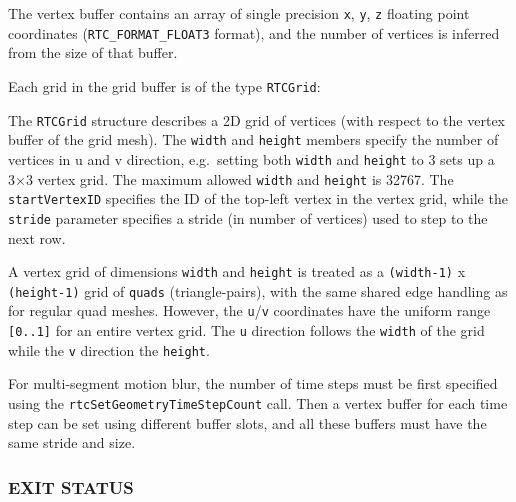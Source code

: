 The vertex buffer contains an array of single precision \texttt{x},
\texttt{y}, \texttt{z} floating point coordinates
(\texttt{RTC\_FORMAT\_FLOAT3} format), and the number of vertices is
inferred from the size of that buffer.

Each grid in the grid buffer is of the type \texttt{RTCGrid}:

\begin{Shaded}
\begin{Highlighting}[]
\OperatorTok{\{}
   \OperatorTok{;}
   \OperatorTok{;}
   \OperatorTok{,}\OperatorTok{;} 
\OperatorTok{\};}
\end{Highlighting}
\end{Shaded}

The \texttt{RTCGrid} structure describes a 2D grid of vertices (with
respect to the vertex buffer of the grid mesh). The \texttt{width} and
\texttt{height} members specify the number of vertices in u and v
direction, e.g.~setting both \texttt{width} and \texttt{height} to 3
sets up a 3×3 vertex grid. The maximum allowed \texttt{width} and
\texttt{height} is 32767. The \texttt{startVertexID} specifies the ID of
the top-left vertex in the vertex grid, while the \texttt{stride}
parameter specifies a stride (in number of vertices) used to step to the
next row.

A vertex grid of dimensions \texttt{width} and \texttt{height} is
treated as a \texttt{(width-1)} x \texttt{(height-1)} grid of
\texttt{quads} (triangle-pairs), with the same shared edge handling as
for regular quad meshes. However, the \texttt{u}/\texttt{v} coordinates
have the uniform range \texttt{{[}0..1{]}} for an entire vertex grid.
The \texttt{u} direction follows the \texttt{width} of the grid while
the \texttt{v} direction the \texttt{height}.

For multi-segment motion blur, the number of time steps must be first
specified using the \texttt{rtcSetGeometryTimeStepCount} call. Then a
vertex buffer for each time step can be set using different buffer
slots, and all these buffers must have the same stride and size.

\subsubsection{EXIT STATUS}\label{exit-status}

